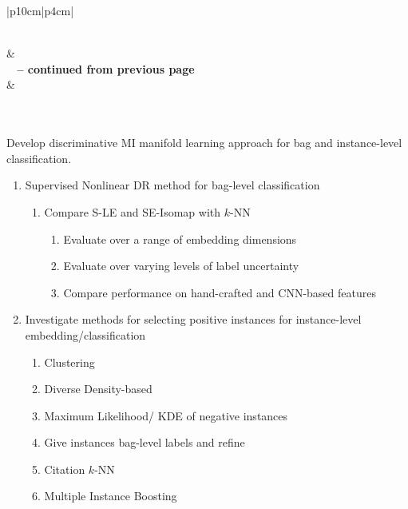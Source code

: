 \begin{longtable}{|p{10cm}|p{4cm}|} 
	\caption[List of Research Tasks]{List of research tasks and their corresponding estimated dates for completion.}
	\label{tab:future_tasks}\\
	\hline {} &  \\ \hline
	\endfirsthead
	{{\bfseries \tablename\ \thetable{} -- continued from previous page}} \\
	\hline {} &  
	\\
	\hline
	\endhead
	\hline {} \\ \hline
	\endfoot
	\hline \hline
	\endlastfoot


	 \\
	\hline
	Develop discriminative MI manifold learning approach for bag and instance-level classification. 
	\begin{enumerate}
		\item Supervised Nonlinear DR method for bag-level classification \label{item:supervisedDR_bag_level}
		\begin{enumerate}
			\item Compare S-LE and SE-Isomap  with $k$-NN
			\begin{enumerate}
				\item Evaluate over a range of embedding dimensions
				\item Evaluate over varying levels of label uncertainty
				\item Compare performance on hand-crafted and CNN-based features
			\end{enumerate}
		\end{enumerate}
		
		\item Investigate methods for selecting positive instances for instance-level  embedding/classification
		\begin{enumerate}
			\item Clustering
			\item Diverse Density-based
			\item Maximum Likelihood/ KDE of negative instances
			\item Give instances bag-level labels and refine
			\item Citation $k$-NN
			\item Multiple Instance Boosting
		\end{enumerate}
	

\end{enumerate}
\end{longtable}
